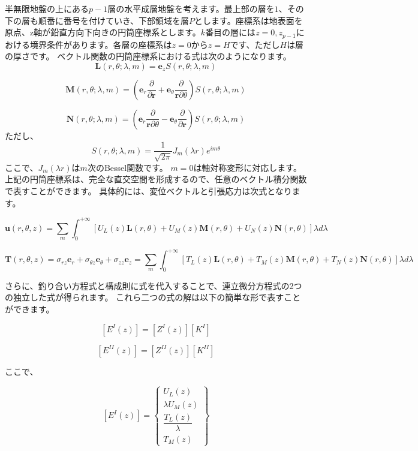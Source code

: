 半無限地盤の上にある$p-1$層の水平成層地盤を考えます。最上部の層を$1$、その下の層も順番に番号を付けていき、下部領域を層$P$とします。座標系は地表面を原点、z軸が鉛直方向下向きの円筒座標系とします。$k$番目の層には$z=0,z_{p-1}$における境界条件があります。各層の座標系は$z=0$から$z=H$です、ただし$H$は層の厚さです。
ベクトル関数の円筒座標系における式は次のようになります。
\[\mathbf{L}\left(r,\theta;\lambda,m\right)=\mathbf{e}_{z}S\left(r,\theta;\lambda,m\right)\]

\[\mathbf{M}\left(r,\theta;\lambda,m\right)=\left(\mathbf{e}_{r}\dfrac{\partial}{\partial\mathbf{r}}+\mathbf{e}_{\theta}\dfrac{\partial}{\mathbf{r}\partial\theta}\right)S\left(r,\theta;\lambda,m\right)\]

\[\mathbf{N}\left(r,\theta;\lambda,m\right)=\left(\mathbf{e}_{r}\dfrac{\partial}{\mathbf{r}\partial\theta}-\mathbf{e}_{\theta}\dfrac{\partial}{\partial\mathbf{r}}\right)S\left(r,\theta;\lambda,m\right)\]
ただし、
\[S\left(r,\theta;\lambda,m\right)=\dfrac{1}{\sqrt{2\pi}}J_{m}\left(\lambda r\right)e^{im\theta}\]
ここで、$J_{m}(\lambda r)$は$m$次のBessel関数です。
$m=0$は軸対称変形に対応します。上記の円筒座標系は、完全な直交空間を形成するので、任意のベクトル積分関数で表すことができます。
具体的には、変位ベクトルと引張応力は次式となります。

\[\mathbf{u}\left(r,\theta,z\right)=\sum_{m}\int_{0}^{+\infty}\left[U_{L}\left(z\right)\mathbf{L}\left(r,\theta\right)+U_{M}\left(z\right)\mathbf{M}\left(r,\theta\right)+U_{N}\left(z\right)\mathbf{N}\left(r,\theta\right)\right]\lambda d\lambda\]

\[\mathbf{T}\left(r,\theta,z\right)=\sigma_{rz}\mathbf{e}_{r}+\sigma_{\theta z}\mathbf{e}_{\theta}+\sigma_{zz}\mathbf{e}_{z}=\sum_{m}\int_{0}^{+\infty}\left[T_{L}\left(z\right)\mathbf{L}\left(r,\theta\right)+T_{M}\left(z\right)\mathbf{M}\left(r,\theta\right)+T_{N}\left(z\right)\mathbf{N}\left(r,\theta\right)\right]\lambda d\lambda\]

さらに、釣り合い方程式と構成則に式を代入することで、連立微分方程式の2つの独立した式が得られます。
これら二つの式の解は以下の簡単な形で表すことができます。

\[\left[E^{I}\left(z\right)\right]=\left[Z^{I}\left(z\right)\right]\left[K^{I}\right]\]

\[\left[E^{II}\left(z\right)\right]=\left[Z^{II}\left(z\right)\right]\left[K^{II}\right]\]

ここで、

\[\left[E^{I}\left(z\right)\right]=\left\{ \begin{array}{c}
U_{L}\left(z\right)\\
\lambda U_{M}\left(z\right)\\
\dfrac{T_{L}\left(z\right)}{\lambda}\\
T_{M}\left(z\right)
\end{array}\right\}\]


